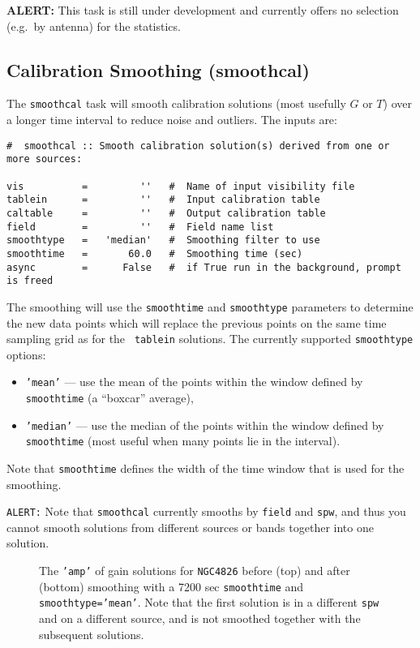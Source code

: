 {\bf ALERT:} This task is still under development and currently offers no
selection (e.g.\ by antenna) for the statistics.

\subsection{Calibration Smoothing ({\rm smoothcal})}
\label{section:cal.tables.smooth}

The {\tt smoothcal} task will smooth calibration solutions 
(most usefully $G$ or $T$) over a longer time interval to reduce noise
and outliers.  The inputs are:
\small
\begin{verbatim}
#  smoothcal :: Smooth calibration solution(s) derived from one or more sources:

vis          =         ''   #  Name of input visibility file
tablein      =         ''   #  Input calibration table
caltable     =         ''   #  Output calibration table
field        =         ''   #  Field name list
smoothtype   =   'median'   #  Smoothing filter to use
smoothtime   =       60.0   #  Smoothing time (sec)
async        =      False   #  if True run in the background, prompt is freed
\end{verbatim}
\normalsize

The smoothing will use the {\tt smoothtime} and {\tt smoothtype}
parameters to determine the new data points which will replace the
previous points on the same time sampling grid as for the {\tt
tablein} solutions.  The currently supported {\tt smoothtype} 
options: 
\begin{itemize}
\item {\tt 'mean'} --- use the mean of the points within the window
defined by {\tt smoothtime} (a ``boxcar'' average),

\item {\tt 'median'} --- use the median of the points within the window
defined by {\tt smoothtime} (most useful when many points lie in the
interval).
\end{itemize}
Note that {\tt smoothtime} defines the width of the time window that
is used for the smoothing.

{\tt ALERT:} Note that {\tt smoothcal} currently smooths by
{\tt field} and {\tt spw}, and thus you cannot smooth solutions
from different sources or bands together into one solution.

\begin{figure}[h!]
\begin{center}
\caption{\label{fig:smoothcal_4826} The {\tt 'amp'} of gain solutions
for {\tt NGC4826} before (top) and after (bottom) smoothing with
a 7200 sec {\tt smoothtime} and {\tt smoothtype='mean'}.  Note that
the first solution is in a different {\tt spw} and on a different
source, and is not smoothed together with the subsequent solutions.}
\hrulefill
\end{center}
\end{figure}

